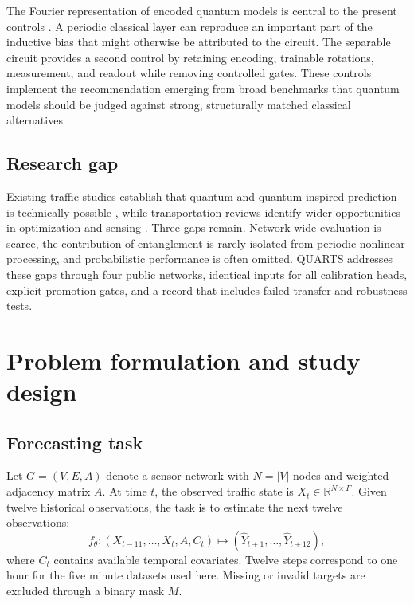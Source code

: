\documentclass[pdflatex,sn-mathphys-num]{sn-jnl}
\begin{document}
The Fourier representation of encoded quantum models is central to the present controls \cite{schuld2021encoding}. A periodic classical layer can reproduce an important part of the inductive bias that might otherwise be attributed to the circuit. The separable circuit provides a second control by retaining encoding, trainable rotations, measurement, and readout while removing controlled gates. These controls implement the recommendation emerging from broad benchmarks that quantum models should be judged against strong, structurally matched classical alternatives \cite{bowles2024benchmark}.

\subsection{Research gap}\label{subsec:gap}

Existing traffic studies establish that quantum and quantum inspired prediction is technically possible \cite{schetakis2025trafficqnn,rajagopal2025mthqgnn}, while transportation reviews identify wider opportunities in optimization and sensing \cite{usdot2024quantum,mohammed2025annealingreview}. Three gaps remain. Network wide evaluation is scarce, the contribution of entanglement is rarely isolated from periodic nonlinear processing, and probabilistic performance is often omitted. QUARTS addresses these gaps through four public networks, identical inputs for all calibration heads, explicit promotion gates, and a record that includes failed transfer and robustness tests.

\section{Problem formulation and study design}\label{sec:problem}

\subsection{Forecasting task}\label{subsec:task}

Let \(G=(V,E,A)\) denote a sensor network with \(N=|V|\) nodes and weighted adjacency matrix \(A\). At time \(t\), the observed traffic state is \(X_t\in\mathbb{R}^{N\times F}\). Given twelve historical observations, the task is to estimate the next twelve observations:
\begin{equation}
 f_{\theta}: (X_{t-11},\ldots,X_t,A,C_t)\longmapsto
 (\widehat{Y}_{t+1},\ldots,\widehat{Y}_{t+12}),
\label{eq:forecast}
\end{equation}
where \(C_t\) contains available temporal covariates. Twelve steps correspond to one hour for the five minute datasets used here. Missing or invalid targets are excluded through a binary mask \(M\).
\end{document}
